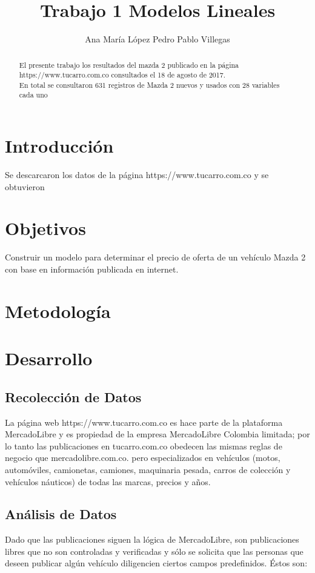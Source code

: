 \documentclass[a4paper]{article}
\title{Trabajo 1 Modelos Lineales}
\author{Ana María López Pedro Pablo Villegas}
\begin{document}
\maketitle

\begin{abstract}
El presente trabajo los resultados del mazda 2 publicado en la página https://www.tucarro.com.co consultados el 18 de agosto de 2017.\\
En total se consultaron 631 registros de Mazda 2 nuevos y usados con 28 variables cada uno
\end{abstract}

\section{Introducción}

Se descarcaron los datos de la página https://www.tucarro.com.co y se obtuvieron 

\section{Objetivos}
Construir un modelo para determinar el precio de oferta de un vehículo Mazda 2 con base en información publicada en internet.

\section{Metodología}

\section{Desarrollo}

\subsection{Recolección de Datos}
La página web https://www.tucarro.com.co es hace parte de la plataforma MercadoLibre y es propiedad de la empresa MercadoLibre Colombia limitada; por lo tanto las publicaciones en tucarro.com.co obedecen las mismas reglas de negocio que mercadolibre.com.co. pero especializados en vehículos (motos, automóviles, camionetas, camiones, maquinaria pesada, carros de colección y vehículos náuticos) de todas las marcas, precios y años. \\

\subsection{Análisis de Datos}
Dado que las publicaciones siguen la lógica de MercadoLibre, son publicaciones libres que no son controladas y verificadas y sólo se solicita que las personas que deseen publicar algún vehículo diligencien ciertos campos predefinidos. Éstos son:\\
\end{document}
